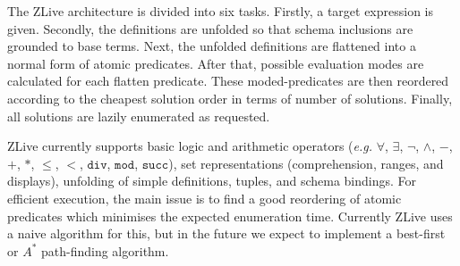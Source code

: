 \documentclass{llncs}
\begin{document}
    The ZLive architecture is divided into six tasks.  Firstly, a
    target expression is given. Secondly, the definitions are unfolded
    so that schema inclusions are grounded to base terms. Next, the
    unfolded definitions are flattened into a normal form of atomic predicates.
    After that, possible evaluation modes are calculated for each flatten 
    predicate.  These moded-predicates are then reordered according to the 
    cheapest solution order in terms of number of solutions.  Finally, 
    all solutions are lazily enumerated as requested.

    ZLive currently supports basic logic and arithmetic operators
    (\textit{e.g.} $\forall$, $\exists$, $\lnot$, $\land$, $-$,
    $+$, $*$, $\leq$, $<$, $\mathtt{div}$, $\mathtt{mod}$, $\mathtt{succ}$),
    set representations (comprehension, ranges, and displays), unfolding
    of simple definitions, tuples, and schema bindings.
    For efficient execution, the main issue is to find a good reordering
    of atomic predicates which minimises the expected enumeration time.
    Currently ZLive uses a naive algorithm for this, but in the future we
    expect to implement a best-first or $A^{*}$ path-finding algorithm.
\end{document}
